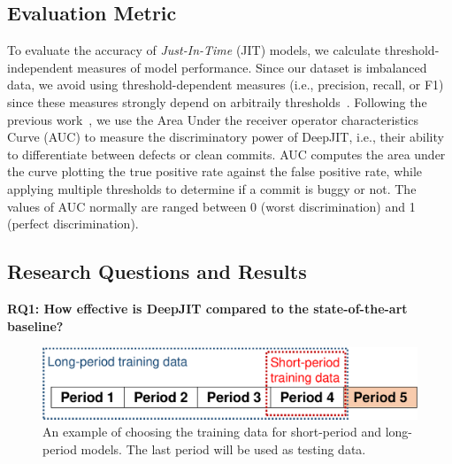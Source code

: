\subsection{Evaluation Metric}
\label{sec:metric}
To evaluate the accuracy of \emph{Just-In-Time} (JIT) models, we calculate  threshold-independent measures of model performance. Since our dataset is imbalanced data, we avoid using threshold-dependent measures (i.e., precision, recall, or F1) since these measures strongly depend on arbitraily thresholds~\cite{nguyen2009learning, gu2008data}. Following the previous work~\cite{mcintosh2018fix},  we use the Area Under the receiver operator characteristics
Curve (AUC) to measure the discriminatory power of DeepJIT, i.e., their ability to differentiate between defects or clean commits. AUC computes the area under the curve plotting the true positive rate against the false positive rate, while applying multiple thresholds to determine if a commit is buggy or not. The values of AUC normally are ranged between 0 (worst discrimination) and 1 (perfect discrimination). 

\subsection{Research Questions and Results}
\label{sec:rq_results}

\noindent \textbf{RQ1: How effective is DeepJIT compared to the state-of-the-art baseline?}

\begin{figure}
	\center
	\includegraphics[scale=0.36]{figs/split.pdf}
	\caption{An example of choosing the training data for short-period and long-period models. The last period will be used as testing data.}
	\label{fig:splitting}
\end{figure}

